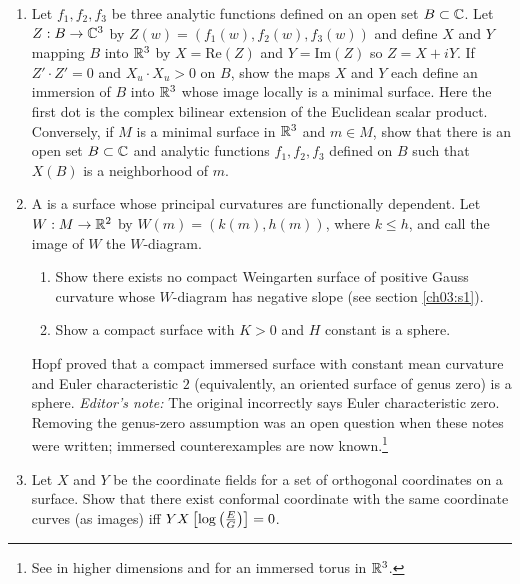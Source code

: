 \documentclass[../main]{subfiles}
\begin{document}
\begin{enumerate}
    \item\label{pro:90} Let $f_1, f_2, f_3$ be three analytic functions defined on an open set $B\subset\mathbb{C}$. Let $Z:B\to\mathbb{C}^3$ by $Z(w) = (f_1(w), f_2(w), f_3(w))$ and define $X$ and $Y$ mapping $B$ into $\mathbb{R}^3$ by $X=\mathrm{Re}(Z)$ and $Y=\mathrm{Im}(Z)$ so $Z = X+iY$. 
    If $Z'\cdot Z'=0$ and $X_u\cdot X_u>0$ on $B$, show the maps $X$ and $Y$ each define an immersion of $B$ into $\mathbb{R}^3$ whose image locally is a minimal surface. Here the first dot is the complex bilinear extension of the Euclidean scalar product. Conversely, if $M$ is a minimal surface in $\mathbb{R}^3$ and $m\in M$, show that there is an open set $B\subset\mathbb{C}$ and analytic functions $f_1,f_2,f_3$ defined on $B$ such that $X(B)$ is a neighborhood of $m$.
    \item\label{pro:91} A  is a surface whose principal curvatures are functionally dependent. Let $W:M\to\mathbb{R}^2$ by $W(m)=(k(m),h(m))$, where $k\leq h$, and call the image of $W$ the $W$-diagram.
    \begin{enumerate}[label=(\roman*)]
        \item Show there exists no compact Weingarten surface of positive Gauss curvature whose $W$-diagram has negative slope (see section \ref{ch03:s1}).
        \item Show a compact surface with $K>0$ and $H$ constant is a sphere. 
    \end{enumerate}
    Hopf \cite{hopf1950uber} proved that a compact immersed surface with constant mean curvature and Euler characteristic $2$ (equivalently, an oriented surface of genus zero) is a sphere. \emph{Editor's note:} The original incorrectly says Euler characteristic zero. Removing the genus-zero assumption was an open question when these notes were written; immersed counterexamples are now known.\footnote{See \cite{hsiang1982generalized} in higher dimensions and \cite{wente1986counterexample} for an immersed torus in $\mathbb{R}^3$.}
    \item\label{pro:92} Let $X$ and $Y$ be the coordinate fields for a set of orthogonal coordinates on a surface. Show that there exist conformal coordinate with the same coordinate curves (as images) iff $YX\left[\log\left(\frac{E}{G}\right)\right] = 0$.
\end{enumerate}
\end{document}
